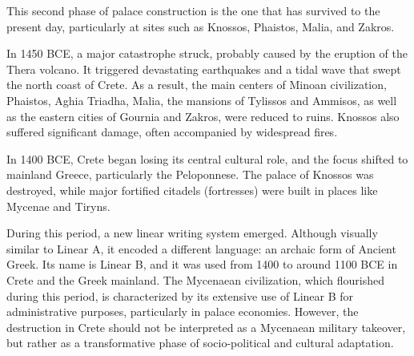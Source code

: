 This second phase of palace construction is the one that has survived to the present day, particularly at sites such as Knossos, Phaistos, Malia, and Zakros.

In 1450 BCE, a major catastrophe struck, probably caused by the eruption of the Thera volcano.
It triggered devastating earthquakes and a tidal wave that swept the north coast of Crete.
As a result, the main centers of Minoan civilization, Phaistos, Aghia Triadha, Malia, the mansions of Tylissos and Ammisos, as well as the eastern cities of Gournia and Zakros, were reduced to ruins.
Knossos also suffered significant damage, often accompanied by widespread fires. \cite{alexiou-ch4}

In 1400 BCE, Crete began losing its central cultural role, and the focus shifted to mainland Greece, particularly the Peloponnese.
The palace of Knossos was destroyed, while major fortified citadels (fortresses) were built in places like Mycenae and Tiryns. \cite{alexiou-ch5}

During this period, a new linear writing system emerged.
Although visually similar to Linear A, it encoded a different language: an archaic form of Ancient Greek.
Its name is Linear B, and it was used from 1400 to around 1100 BCE in Crete and the Greek mainland.
The Mycenaean civilization, which flourished during this period, is characterized by its extensive use of Linear B for administrative purposes, particularly in palace economies.
However, the destruction in Crete should not be interpreted as a Mycenaean military takeover, but rather as a transformative phase of socio-political and cultural adaptation. \cite{salg-ch5}


